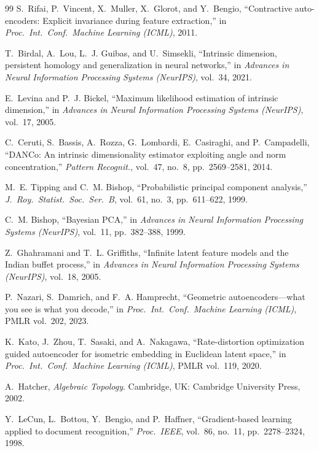 \documentclass[11pt,a4paper]{jsarticle}
\begin{document}
\begin{thebibliography}{99}
S.~Rifai, P.~Vincent, X.~Muller, X.~Glorot, and Y.~Bengio,
``Contractive auto-encoders: Explicit invariance during feature extraction,''
in \textit{Proc.\ Int.\ Conf.\ Machine Learning (ICML)}, 2011.

T.~Birdal, A.~Lou, L.~J. Guibas, and U.~Simsekli,
``Intrinsic dimension, persistent homology and generalization in neural
networks,''
in \textit{Advances in Neural Information Processing Systems (NeurIPS)},
vol.~34, 2021.

E.~Levina and P.~J. Bickel,
``Maximum likelihood estimation of intrinsic dimension,''
in \textit{Advances in Neural Information Processing Systems (NeurIPS)},
vol.~17, 2005.

C.~Ceruti, S.~Bassis, A.~Rozza, G.~Lombardi, E.~Casiraghi, and
P.~Campadelli,
``DANCo: An intrinsic dimensionality estimator exploiting angle and norm
concentration,''
\textit{Pattern Recognit.}, vol.~47, no.~8, pp.~2569--2581, 2014.

M.~E. Tipping and C.~M. Bishop,
``Probabilistic principal component analysis,''
\textit{J.\ Roy.\ Statist.\ Soc.\ Ser.\ B}, vol.~61, no.~3, pp.~611--622,
1999.

C.~M. Bishop,
``Bayesian PCA,''
in \textit{Advances in Neural Information Processing Systems (NeurIPS)},
vol.~11, pp.~382--388, 1999.

Z.~Ghahramani and T.~L. Griffiths,
``Infinite latent feature models and the Indian buffet process,''
in \textit{Advances in Neural Information Processing Systems (NeurIPS)},
vol.~18, 2005.

P.~Nazari, S.~Damrich, and F.~A. Hamprecht,
``Geometric autoencoders---what you see is what you decode,''
in \textit{Proc.\ Int.\ Conf.\ Machine Learning (ICML)}, PMLR vol.~202, 2023.

K.~Kato, J.~Zhou, T.~Sasaki, and A.~Nakagawa,
``Rate-distortion optimization guided autoencoder for isometric embedding in
Euclidean latent space,''
in \textit{Proc.\ Int.\ Conf.\ Machine Learning (ICML)}, PMLR vol.~119, 2020.

A.~Hatcher,
\textit{Algebraic Topology}.
Cambridge, UK: Cambridge University Press, 2002.

Y.~LeCun, L.~Bottou, Y.~Bengio, and P.~Haffner,
``Gradient-based learning applied to document recognition,''
\textit{Proc.\ IEEE}, vol.~86, no.~11, pp.~2278--2324, 1998.


\end{thebibliography}
\end{document}
